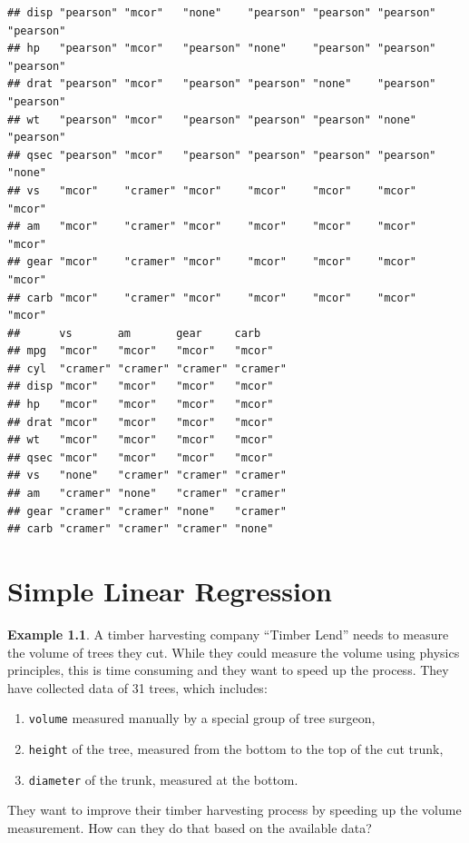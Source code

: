 \documentclass[
]{book}
\providecommand{\tightlist}{%
  \setlength{\itemsep}{0pt}\setlength{\parskip}{0pt}}
\theoremstyle{definition}
\theoremstyle{definition}
\newtheorem{example}{Example}[chapter]
\theoremstyle{definition}
\theoremstyle{definition}
\theoremstyle{remark}
\begin{document}
\begin{verbatim}
## disp "pearson" "mcor"   "none"    "pearson" "pearson" "pearson" "pearson"
## hp   "pearson" "mcor"   "pearson" "none"    "pearson" "pearson" "pearson"
## drat "pearson" "mcor"   "pearson" "pearson" "none"    "pearson" "pearson"
## wt   "pearson" "mcor"   "pearson" "pearson" "pearson" "none"    "pearson"
## qsec "pearson" "mcor"   "pearson" "pearson" "pearson" "pearson" "none"   
## vs   "mcor"    "cramer" "mcor"    "mcor"    "mcor"    "mcor"    "mcor"   
## am   "mcor"    "cramer" "mcor"    "mcor"    "mcor"    "mcor"    "mcor"   
## gear "mcor"    "cramer" "mcor"    "mcor"    "mcor"    "mcor"    "mcor"   
## carb "mcor"    "cramer" "mcor"    "mcor"    "mcor"    "mcor"    "mcor"   
##      vs       am       gear     carb    
## mpg  "mcor"   "mcor"   "mcor"   "mcor"  
## cyl  "cramer" "cramer" "cramer" "cramer"
## disp "mcor"   "mcor"   "mcor"   "mcor"  
## hp   "mcor"   "mcor"   "mcor"   "mcor"  
## drat "mcor"   "mcor"   "mcor"   "mcor"  
## wt   "mcor"   "mcor"   "mcor"   "mcor"  
## qsec "mcor"   "mcor"   "mcor"   "mcor"  
## vs   "none"   "cramer" "cramer" "cramer"
## am   "cramer" "none"   "cramer" "cramer"
## gear "cramer" "cramer" "none"   "cramer"
## carb "cramer" "cramer" "cramer" "none"
\end{verbatim}

\chapter{Simple Linear Regression}\label{simpleLinearRegression}

\begin{example}
A timber harvesting company ``Timber Lend'' needs to measure the volume of trees they cut. While they could measure the volume using physics principles, this is time consuming and they want to speed up the process. They have collected data of 31 trees, which includes:

\begin{enumerate}
\def\labelenumi{\arabic{enumi}.}
\tightlist
\item
  \texttt{volume} measured manually by a special group of tree surgeon,
\item
  \texttt{height} of the tree, measured from the bottom to the top of the cut trunk,
\item
  \texttt{diameter} of the trunk, measured at the bottom.
\end{enumerate}

They want to improve their timber harvesting process by speeding up the volume measurement. How can they do that based on the available data?
\end{example}
\end{document}
